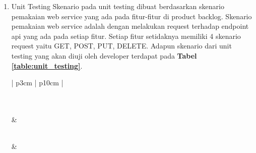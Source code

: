\begin{enumerate}
\item Unit Testing
Skenario pada unit testing dibuat berdasarkan skenario pemakaian web service yang ada pada fitur-fitur di product backlog. Skenario pemakaian web service adalah dengan melakukan request terhadap endpoint api yang ada pada setiap fitur. Setiap fitur setidaknya memiliki 4 skenario request yaitu GET, POST, PUT, DELETE. Adapun skenario dari unit testing yang akan diuji oleh developer terdapat pada \textbf{Tabel \ref{table:unit_testing}}.
\begin{longtable}{| p{3cm} | p{10cm} |}
\caption{Skenario unit testing.\label{table:unit_testing}}\\

\hline
{}\\
\hline
{} & \\
\hline
\endfirsthead

\hline
{}\\
\hline
{} & \\
\hline
\endhead

\hline
\endfoot

\hline
{}\\
\hline\hline
\endlastfoot


\end{longtable}
\end{enumerate}
